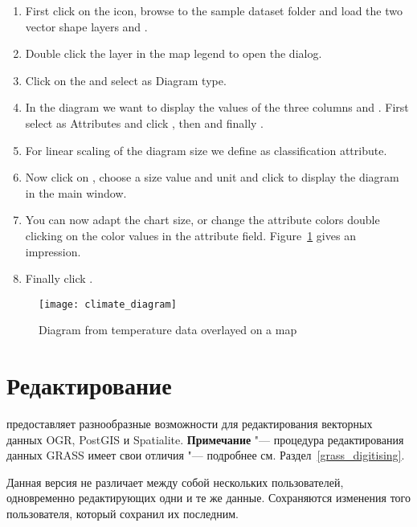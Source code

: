\begin{enumerate}
\item First click on the  icon,
browse to the \qg sample dataset folder and load the two vector shape layers
 and .
\item Double click the  layer in the map legend to open the
 dialog.
\item Click on the  and select  as
Diagram type.
\item In the diagram we want to display the values of the three columns
 and . First select
 as Attributes and click , then
 and finally .
\item For linear scaling of the diagram size we define 
as classification attribute.
\item Now click on , choose a size value and unit
and click  to display the diagram in the \qg main window.
\item You can now adapt the chart size, or change the attribute colors double
clicking on the color values in the attribute field.
Figure~\ref{fig:climatediagram} gives an impression.
\item Finally click .
\end{enumerate}

\begin{figure}[ht]
   \centering
   \texttt{[image: climate\_diagram]}
   \caption{Diagram from temperature data overlayed on a map \nixcaption}\label{fig:climatediagram}
\end{figure}

\section{Редактирование}

\qg предоставляет разнообразные возможности для редактирования векторных
данных OGR, PostGIS и Spatialite. \textbf{Примечание} "--- процедура
редактирования данных GRASS имеет свои отличия "--- подробнее см.
Раздел~\ref{grass_digitising}.

\begin{Tip}\caption{\textsc{Параллельное редактирование}}
Данная версия \qg не различает между собой нескольких пользователей,
одновременно редактирующих одни и те же данные. Сохраняются изменения
того пользователя, который сохранил их последним.
\end{Tip}

